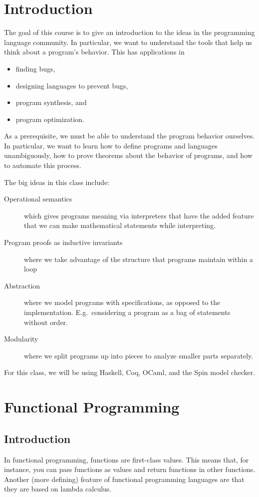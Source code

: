 \documentclass[class=scrartcl]{standalone}
\begin{document}
\chapter{Introduction}
The goal of this course is to give an introduction to
the ideas in the programming language community.
In particular, we want to understand the tools that help us
think about a program's behavior.
This has applications in
\begin{itemize}
  \item finding bugs,
  \item designing languages to prevent bugs,
  \item program synthesis, and
  \item program optimization.
\end{itemize}
As a prerequisite,
we must be able to understand the program behavior ourselves.
In particular, we want to learn
  how to define programs and languages unambiguously,
  how to prove theorems about the behavior of programs, and
  how to automate this process.

The big ideas in this class include:
\begin{description}
  \item[Operational semantics] which gives programs meaning
    via interpreters that have the added feature that we can
    make mathematical statements while interpreting.
  \item[Program proofs as inductive invariants]
    where we take advantage of the structure
    that programs maintain within a loop
  \item[Abstraction] where we model programs with specifications,
    as opposed to the implementation.
    E.g.\ considering a program as a bag of statements without order.
  \item[Modularity] where we split programs up into pieces to analyze
    smaller parts separately.
\end{description}

For this class, we will be using
  Haskell,
  Coq,
  OCaml, and
  the Spin model checker.


\chapter{Functional Programming}
\section{Introduction}
In functional programming, functions are first-class values.
This means that, for instance, you can pass functions as values and
  return functions in other functions.
Another (more defining) feature of functional programming languages are that
they are based on lambda calculus.
\end{document}
